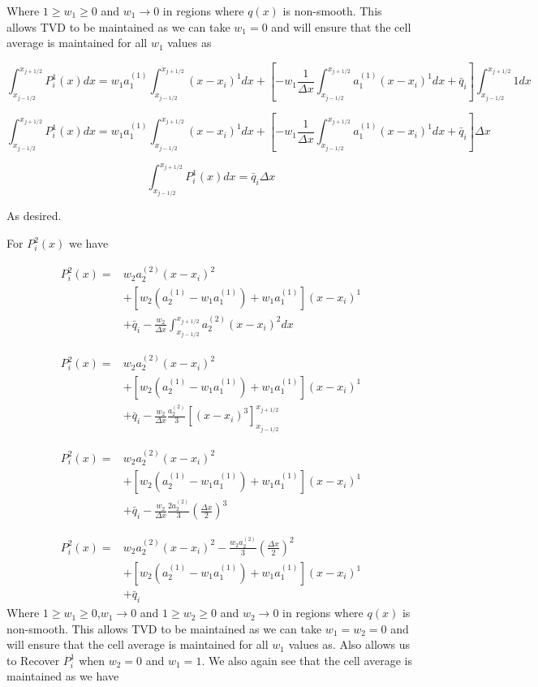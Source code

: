 \documentclass[10pt]{article}
\begin{document}
 

Where $1 \ge w_1 \ge 0$ and  $w_1 \rightarrow 0$ in regions where $q(x)$ is non-smooth. This allows TVD to be maintained as we can take $w_1 = 0$ and will ensure that the cell average is maintained for all $w_1$ values as

\[\int_{x_{j-1/2}}^{x_{j+1/2}} P^1_i(x) dx  = w_1 a^{(1)}_1 \int_{x_{j-1/2}}^{x_{j+1/2}}(x  - x_i)^1 dx +  \left[-  w_1\frac{1}{\Delta x}\int_{x_{j-1/2}}^{x_{j+1/2}}a^{(1)}_1(x  - x_i)^1 dx +  \bar{q}_i\right] \int_{x_{j-1/2}}^{x_{j+1/2}}1 dx\] 

\[\int_{x_{j-1/2}}^{x_{j+1/2}} P^1_i(x) dx  = w_1 a^{(1)}_1 \int_{x_{j-1/2}}^{x_{j+1/2}}(x  - x_i)^1 dx +  \left[-  w_1 \frac{1}{\Delta x}\int_{x_{j-1/2}}^{x_{j+1/2}}a^{(1)}_1(x  - x_i)^1 dx +  \bar{q}_i\right]\Delta x\] 

\[\int_{x_{j-1/2}}^{x_{j+1/2}} P^1_i(x) dx  =   \bar{q}_i \Delta x\] 

As desired.

For $P^2_i(x)$ we have

\begin{align*}
P^2_i(x) =& w_2a^{(2)}_2(x  - x_i)^2 \\
&+ \left[w_2\left(a^{(1)}_2 - w_1a^{(1)}_1\right) + w_1a^{(1)}_1\right](x  - x_i)^1 \\
&+ \bar{q}_i  - \frac{ w_2}{\Delta x}\int_{x_{j-1/2}}^{x_{j+1/2}}a^{(2)}_2(x  - x_i)^2 dx
\end{align*}

\begin{align*}
P^2_i(x) =& w_2a^{(2)}_2(x  - x_i)^2 \\
&+ \left[w_2\left(a^{(1)}_2 - w_1a^{(1)}_1\right) + w_1a^{(1)}_1\right](x  - x_i)^1 \\
&+ \bar{q}_i  - \frac{ w_2}{\Delta x}\frac{a^{(2)}_2}{3} \left[ (x  - x_i)^3\right]_{x_{j-1/2}}^{x_{j+1/2}}
\end{align*}

\begin{align*}
P^2_i(x) =& w_2a^{(2)}_2(x  - x_i)^2 \\
&+ \left[w_2\left(a^{(1)}_2 - w_1a^{(1)}_1\right) + w_1a^{(1)}_1\right](x  - x_i)^1 \\
&+ \bar{q}_i  - \frac{ w_2}{\Delta x}\frac{2a^{(2)}_2}{3} \left(\frac{\Delta x}{2}\right)^3
\end{align*}

\begin{align*}
P^2_i(x) =& w_2a^{(2)}_2(x  - x_i)^2 - \frac{w_2 a^{(2)}_2}{3} \left(\frac{\Delta x}{2}\right)^2 \\
&+ \left[w_2\left(a^{(1)}_2 - w_1a^{(1)}_1\right) + w_1a^{(1)}_1\right](x  - x_i)^1 \\
&+ \bar{q}_i 
\end{align*}
Where $1 \ge w_1 \ge 0$,$w_1 \rightarrow 0$ and $1 \ge w_2 \ge 0$ and $w_2 \rightarrow 0$  in regions where $q(x)$ is non-smooth. This allows TVD to be maintained as we can take $w_1 = w_2 = 0$ and will ensure that the cell average is maintained for all $w_1$ values as. Also allows us to Recover $P^1_i$ when $w_2 = 0 $ and $w_1 = 1$. We also again see that the cell average is maintained as we have
\end{document}
